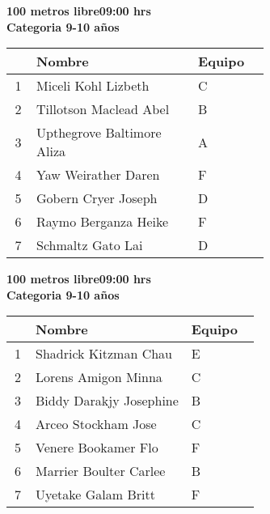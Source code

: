 \begin{minipage}{0.95\linewidth}\vspace{0.5cm} 
\begin{flushleft}
\textbf{
\hspace{-0.15cm}100 metros libre\hspace{1.5cm}09:00 hrs \\Categoria 9-10 años}\vspace{-0.2cm} 
\end{flushleft}
\begin{tabular}{cp{0.63\linewidth}l}
\hline
& \textbf{Nombre} & \textbf{Equipo} \\ \hline
1 & Miceli Kohl Lizbeth & C \\ 
2 & Tillotson Maclead Abel & B \\ 
3 & Upthegrove Baltimore Aliza & A \\ 
4 & Yaw Weirather Daren & F \\ 
5 & Gobern Cryer Joseph & D \\ 
6 & Raymo Berganza Heike & F \\ 
7 & Schmaltz Gato Lai & D \\ 
\end{tabular}
\end{minipage}
\begin{minipage}{0.95\linewidth}\vspace{0.5cm} 
\begin{flushleft}
\textbf{
\hspace{-0.15cm}100 metros libre\hspace{1.5cm}09:00 hrs \\Categoria 9-10 años}\vspace{-0.2cm} 
\end{flushleft}
\begin{tabular}{cp{0.63\linewidth}l}
\hline
& \textbf{Nombre} & \textbf{Equipo} \\ \hline
1 & Shadrick Kitzman Chau & E \\ 
2 & Lorens Amigon Minna & C \\ 
3 & Biddy Darakjy Josephine & B \\ 
4 & Arceo Stockham Jose & C \\ 
5 & Venere Bookamer Flo & F \\ 
6 & Marrier Boulter Carlee & B \\ 
7 & Uyetake Galam Britt & F \\ 
\end{tabular}
\end{minipage}
